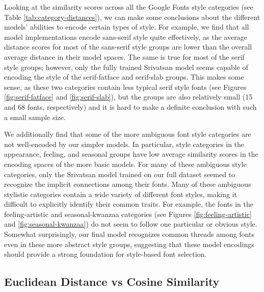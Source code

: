 Looking at the similarity scores across all the Google Fonts style categories (see Table \ref{tab:category-distances}), we can make some conclusions about the different models' abilities to encode certain types of style. For example, we find that all model implementations encode sans-serif style quite effectively, as the average distance scores for most of the sans-serif style groups are lower than the overall average distance in their model spaces. The same is true for most of the serif style groups; however, only the fully trained Srivatsan model seems capable of encoding the style of the serif-fatface and serif-slab groups. This makes some sense, as these two categories contain less typical serif style fonts (see Figures \ref{fig:serif-fatface} and \ref{fig:serif-slab}), but the groups are also relatively small (15 and 68 fonts, respectively) and it is hard to make a definite conclusion with such a small sample size.

We additionally find that some of the more ambiguous font style categories are not well-encoded by our simpler models. In particular, style categories in the appearance, feeling, and seasonal groups have low average similarity scores in the encoding spaces of the more basic models. For many of these ambiguous style categories, only the Srivatsan model trained on our full dataset seemed to recognize the implicit connections among their fonts. Many of these ambiguous stylistic categories contain a wide variety of different font styles, making it difficult to explicitly identify their common traits. For example, the fonts in the feeling-artistic and seasonal-kwanzaa categories (see Figures \ref{fig:feeling-artistic} and \ref{fig:seasonal-kwanzaa}) do not seem to follow one particular or obvious style. Somewhat surprisingly, our final model recognizes common threads among fonts even in these more abstract style groups, suggesting that these model encodings should provide a strong foundation for style-based font selection.

\subsection{Euclidean Distance vs Cosine Similarity}

